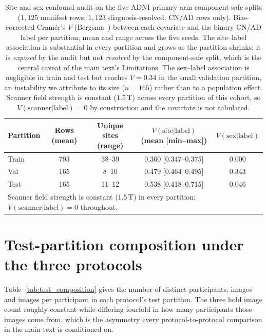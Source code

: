 \documentclass[11pt]{article}
\begin{document}
\begin{table}[!ht]
\centering
\footnotesize
\caption{Site and sex confound audit on the five ADNI primary-arm
component-safe splits ($1{,}125$ manifest rows, $1{,}123$
diagnosis-resolved; CN/AD rows only).
Bias-corrected Cram\'{e}r's $V$ (Bergsma~\cite{bergsma2013}) between each covariate
and the binary CN/AD label per partition; mean and range across the
five seeds. The site--label association is substantial in every
partition and grows as the partition shrinks; it is \emph{exposed}
by the audit but not \emph{resolved} by the component-safe split,
which is the central caveat of the main text's Limitations. The
sex--label association is negligible in train and test but reaches
$V=0.34$ in the small validation partition, an instability we
attribute to its size ($n=165$) rather than to a population effect.
Scanner field strength is constant ($1.5$\,T) across every partition
of this cohort, so $V(\text{scanner}|\text{label})=0$ by
construction and the covariate is not tabulated.}
\label{tab:site_scanner_confound_audit}
\begin{tabular}{@{}lccc c@{}}
\toprule
Partition & Rows (mean) & Unique sites (range) &
$V(\text{site}|\text{label})$ (mean [min--max]) &
$V(\text{sex}|\text{label})$ \\
\midrule
Train & 793 & 38--39 & 0.360 [0.347--0.375] & 0.000 \\
Val   & 165 & 8--10  & 0.479 [0.464--0.495] & 0.343 \\
Test  & 165 & 11--12 & 0.538 [0.418--0.715] & 0.046 \\
\bottomrule
\multicolumn{5}{l}{\footnotesize
Scanner field strength is constant ($1.5$\,T) in every partition;
$V(\text{scanner}|\text{label})=0$ throughout.}
\end{tabular}
\end{table}

\section{Test-partition composition under the three protocols}

Table~\ref{tab:test_composition} gives the number of distinct participants, images and images per participant in each protocol's test partition. The three hold image count roughly constant while differing fourfold in how many participants those images come from, which is the asymmetry every protocol-to-protocol comparison in the main text is conditioned on.
\end{document}

